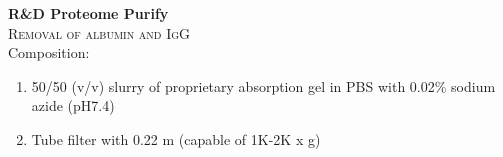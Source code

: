 \textbf{R&D Proteome Purify} 
\\
\textsc{Removal of albumin and IgG}
\\
Composition: 
\begin{enumerate}
\item{50/50 (v/v) slurry of proprietary absorption gel in PBS with 0.02\% sodium azide (pH7.4)}
\item{Tube filter with 0.22 \mu m (capable of 1K-2K x g)}
\end{enumerate}

